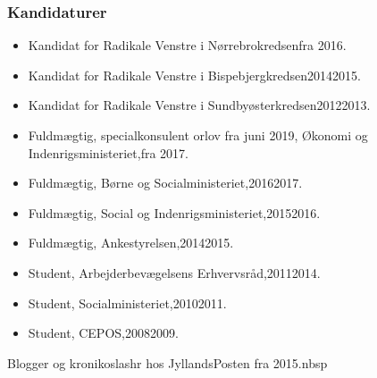 \documentclass[11pt, a4paper]{awesome-cv}
\begin{document}
\begin{cvletter}
\subsubsection*{Kandidaturer}
\begin{itemize}
\item Kandidat for Radikale Venstre i Nørrebrokredsenfra 2016.
\item Kandidat for Radikale Venstre i Bispebjergkredsen20142015.
\item Kandidat for Radikale Venstre i Sundbyøsterkredsen20122013.
\end{itemize}
\begin{itemize}
\item Fuldmægtig, specialkonsulent orlov fra juni 2019, Økonomi og Indenrigsministeriet,fra 2017.
\item Fuldmægtig, Børne og Socialministeriet,20162017.
\item Fuldmægtig, Social og Indenrigsministeriet,20152016.
\item Fuldmægtig, Ankestyrelsen,20142015.
\item Student, Arbejderbevægelsens Erhvervsråd,20112014.
\item Student, Socialministeriet,20102011.
\item Student, CEPOS,20082009.
\end{itemize}
Blogger og kronikoslashr hos JyllandsPosten fra 2015.nbsp

\end{cvletter}
\end{document}
